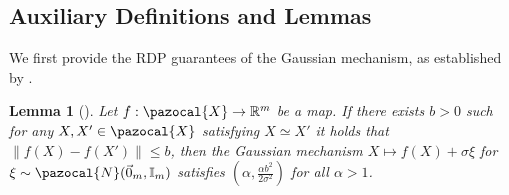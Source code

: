 \documentclass[11pt]{article}
\newtheorem{lem}{Lemma}
\theoremstyle{definition}
\theoremstyle{plain}
\newcommand{\reals}{\mathbb{R}}
\providecommand{\brI}{\mathbb{I}}
\newcommand{\Norm}[1]{\left\| #1 \right\|}
\providecommand{\norm}[1]{\Norm{#1}}
\newcommand{\pM}{\pazocal{M}}
\newcommand{\pN}{\pazocal{N}}
\newcommand{\RDP}{{\normalfont RDP}~}
\begin{document}

\subsection{Auxiliary Definitions and Lemmas}
We first provide the RDP guarantees of the Gaussian mechanism, as established by \citet{mironov2017renyi}. 
\begin{lem}[{\citep{mironov2017renyi}}]
    \label{lem:RDP_Mironov}
    Let \(f : \pazocal{X} \to \reals^{m}\) be a map.
    If there exists \(b > 0\) such for any \(X, X' \in \pazocal{X}\) satisfying \(X \simeq X'\) it holds that \(\|f(X) - f(X')\| \leq b\),
    then the Gaussian mechanism \(X \mapsto f(X) + \sigma \xi\) for \(\xi \sim \pN(\vec{0}_{m}, \brI_{m})\) satisfies \(\left(\alpha, \frac{\alpha b^{2}}{2\sigma^{2}}\right)\) for all \(\alpha > 1\).
\end{lem}
\end{document}
